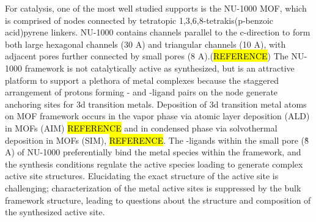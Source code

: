 \documentclass[journal=jctcce,manuscript=article]{achemso}
\begin{document}
For catalysis, one of the most well studied supports is the NU-1000 MOF, which is comprised of  nodes connected by tetratopic 1,3,6,8-tetrakis(p-benzoic acid)pyrene linkers. NU-1000 contains channels parallel to the c-direction to form both large hexagonal channels (30 A) and triangular channels (10 A), with adjacent pores further connected by small pores (8 A).(\hl{REFERENCE}) The NU-1000 framework is not catalytically active as synthesized, but is an attractive platform to support a plethora of metal complexes because the staggered arrangement of protons forming - and -ligand pairs on the node generate anchoring sites for 3d transition metals.\cite{Planas2014} Deposition of 3d transition metal atoms on MOF framework occurs in the vapor phase via atomic layer deposition (ALD) in MOFs (AIM) \hl{REFERENCE} and in condensed phase via solvothermal deposition in MOFs (SIM), \hl{REFERENCE}. The -ligands within the small pore (\~8 A) of NU-1000 preferentially bind the metal species within the framework,\cite{Gallington2016,Rimoldi2017} and the synthesis conditions regulate the active species loading to generate complex active site structures.\cite{Kim2015} Elucidating the exact structure of the active site is challenging; characterization of the metal active sites is suppressed by the bulk framework structure, leading to questions about the structure and composition of the synthesized active site.

\end{document}
